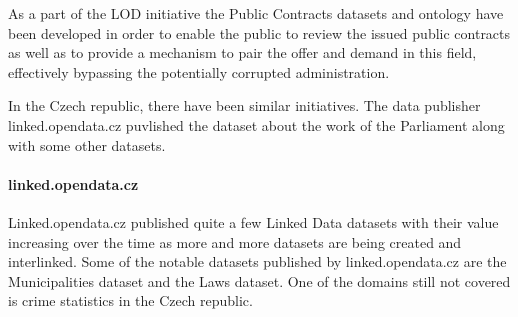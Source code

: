 As a part of the LOD initiative the Public Contracts datasets and ontology have been developed in order to enable the public to review the issued public contracts as well as to provide a mechanism to pair the offer and demand in this field, effectively bypassing the potentially corrupted administration.

In the Czech republic, there have been similar initiatives. The data publisher linked.opendata.cz puvlished the dataset about the work of the Parliament along with some other datasets.

\paragraph{linked.opendata.cz}
Linked.opendata.cz published quite a few Linked Data datasets with their value increasing over the time as more and more datasets are being created and interlinked.
Some of the notable datasets published by linked.opendata.cz are the Municipalities dataset and the Laws dataset.
One of the domains still not covered is crime statistics in the Czech republic.
